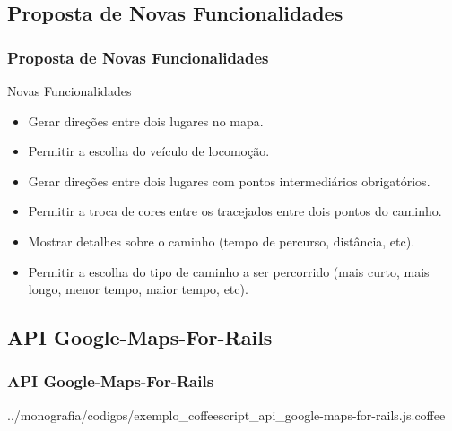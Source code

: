  \subsection{Proposta de Novas Funcionalidades}
\begin{frame}
 \frametitle{Proposta de Novas Funcionalidades}

  \begin{block}{Novas Funcionalidades}   

   \begin{itemize}

    \item  Gerar direções entre dois lugares no mapa.

    \item  Permitir a escolha do veículo de locomoção.

    \item  Gerar direções entre dois lugares com pontos intermediários obrigatórios.

    \item  Permitir a troca de cores entre os tracejados entre dois pontos do caminho.
    
    \item  Mostrar detalhes sobre o caminho (tempo de percurso, distância, etc).

    \item  Permitir a escolha do tipo de caminho a ser percorrido
    (mais curto, mais longo, menor tempo, maior tempo, etc).

   \end{itemize}

  \end{block}

\end{frame}

\subsection{API Google-Maps-For-Rails}
\begin{frame}
 \frametitle{API Google-Maps-For-Rails}

      
      {../monografia/codigos/exemplo_coffeescript_api_google-maps-for-rails.js.coffee}

\end{frame}


